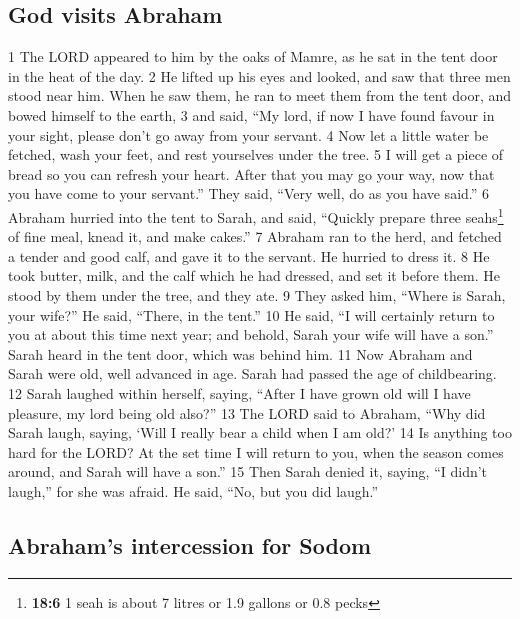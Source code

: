 \hypertarget{god-visits-abraham}{%
\subsection{God visits Abraham}\label{god-visits-abraham}}

{1} The LORD appeared to him by the oaks of Mamre, as he sat in the tent
door in the heat of the day. {2} He lifted up his eyes and looked, and
saw that three men stood near him. When he saw them, he ran to meet them
from the tent door, and bowed himself to the earth, {3} and said, ``My
lord, if now I have found favour in your sight, please don't go away
from your servant. {4} Now let a little water be fetched, wash your
feet, and rest yourselves under the tree. {5} I will get a piece of
bread so you can refresh your heart. After that you may go your way, now
that you have come to your servant.'' They said, ``Very well, do as you
have said.'' {6} Abraham hurried into the tent to Sarah, and said,
``Quickly prepare three seahs\footnote{\textbf{18:6} 1 seah is about 7
  litres or 1.9 gallons or 0.8 pecks} of fine meal, knead it, and make
cakes.'' {7} Abraham ran to the herd, and fetched a tender and good
calf, and gave it to the servant. He hurried to dress it. {8} He took
butter, milk, and the calf which he had dressed, and set it before them.
He stood by them under the tree, and they ate. {9} They asked him,
``Where is Sarah, your wife?'' He said, ``There, in the tent.'' {10} He
said, ``I will certainly return to you at about this time next year; and
behold, Sarah your wife will have a son.'' Sarah heard in the tent door,
which was behind him. {11} Now Abraham and Sarah were old, well advanced
in age. Sarah had passed the age of childbearing. {12} Sarah laughed
within herself, saying, ``After I have grown old will I have pleasure,
my lord being old also?'' {13} The LORD said to Abraham, ``Why did Sarah
laugh, saying, `Will I really bear a child when I am old?' {14} Is
anything too hard for the LORD? At the set time I will return to you,
when the season comes around, and Sarah will have a son.'' {15} Then
Sarah denied it, saying, ``I didn't laugh,'' for she was afraid. He
said, ``No, but you did laugh.''

\hypertarget{abrahams-intercession-for-sodom}{%
\subsection{Abraham's intercession for
Sodom}\label{abrahams-intercession-for-sodom}}

